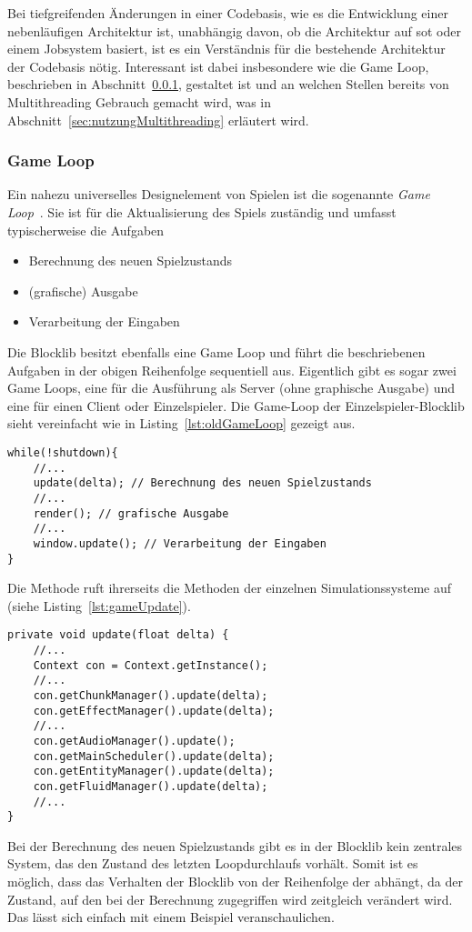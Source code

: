 Bei tiefgreifenden Änderungen in einer Codebasis, wie es die Entwicklung einer nebenläufigen Architektur ist, unabhängig davon, ob die Architektur auf \ac{sot} oder einem Jobsystem basiert, ist es ein Verständnis für die bestehende Architektur der Codebasis nötig. Interessant ist dabei insbesondere wie die Game Loop, beschrieben in Abschnitt~\ref{sec:gameLoop}, gestaltet ist und an welchen Stellen bereits von Multithreading Gebrauch gemacht wird, was in Abschnitt~\ref{sec:nutzungMultithreading} erläutert wird.

\subsubsection{Game Loop}\label{sec:gameLoop}
Ein nahezu universelles Designelement von Spielen ist die sogenannte \emph{Game Loop}~\cite[S.~161~ff.]{Nystrom2015}. Sie ist für die Aktualisierung des Spiels zuständig und umfasst typischerweise die Aufgaben 
\begin{itemize}
  \item Berechnung des neuen Spielzustands
  \item (grafische) Ausgabe
  \item Verarbeitung der Eingaben
\end{itemize}
Die Blocklib besitzt ebenfalls eine Game Loop und führt die beschriebenen Aufgaben in der obigen Reihenfolge sequentiell aus. Eigentlich gibt es sogar zwei Game Loops, eine für die Ausführung als Server (ohne graphische Ausgabe) und eine für einen Client oder Einzelspieler. Die Game-Loop der Einzelspieler-Blocklib sieht vereinfacht wie in Listing~\vref{lst:oldGameLoop} gezeigt aus.
\begin{lstlisting}[caption={Vereinfachte Version der Blocklib für Einzelspieler.},label={lst:oldGameLoop},float]
while(!shutdown){
	//...
	update(delta); // Berechnung des neuen Spielzustands
	//...
	render(); // grafische Ausgabe
	//...
	window.update(); // Verarbeitung der Eingaben
}
\end{lstlisting}

Die Methode  ruft ihrerseits die  Methoden der einzelnen Simulationssysteme auf (siehe Listing~\vref{lst:gameUpdate}).
\begin{lstlisting}[caption={Vereinfachte Update-Methode von \class{Game}.}, label={lst:gameUpdate},float]
private void update(float delta) {
	//...
	Context con = Context.getInstance();
	//...
	con.getChunkManager().update(delta);
	con.getEffectManager().update(delta);
	//...
	con.getAudioManager().update();
	con.getMainScheduler().update(delta);
	con.getEntityManager().update(delta);
	con.getFluidManager().update(delta);
	//...
}
\end{lstlisting}
Bei der Berechnung des neuen Spielzustands gibt es in der Blocklib kein zentrales System, das den Zustand des letzten Loopdurchlaufs vorhält. Somit ist es möglich, dass das Verhalten der Blocklib von der Reihenfolge der  abhängt, da der Zustand, auf den bei der Berechnung zugegriffen wird zeitgleich verändert wird. Das lässt sich einfach mit einem Beispiel veranschaulichen. 

